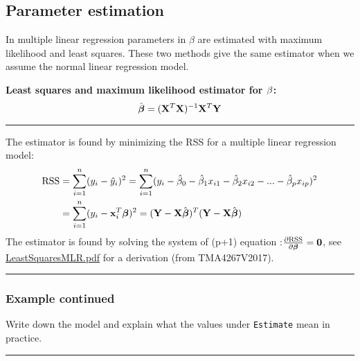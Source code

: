 \documentclass[]{article}
\begin{document}
\hypertarget{parameter-estimation}{%
\subsection{Parameter estimation}\label{parameter-estimation}}

In multiple linear regression parameters in \(\beta\) are estimated with
maximum likelihood and least squares. These two methods give the same
estimator when we assume the normal linear regression model.

\textbf{Least squares and maximum likelihood estimator for
\({\bf \beta}\):}
\[ \hat{\boldsymbol\beta}=({\bf X}^T{\bf X})^{-1} {\bf X}^T {\bf Y}\]

\begin{center}\rule{0.5\linewidth}{\linethickness}\end{center}

The estimator is found by minimizing the RSS for a multiple linear
regression model:
\[\begin{aligned} \text{RSS} &=\sum_{i=1}^n (y_i - \hat y_i)^2 = \sum_{i=1}^n (y_i - \hat \beta_0 - \hat \beta_1 x_{i1} - \hat \beta_2 x_{i2} -...-\hat \beta_p x_{ip} )^2 \\
&= \sum_{i=1}^n (y_i-{\bf x}_i^T \boldsymbol \beta)^2=({\bf Y}-{\bf X}\hat{\boldsymbol{\beta}})^T({\bf Y}-{\bf X}\hat{\boldsymbol{\beta}})\end{aligned}\]
The estimator is found by solving the system of (p+1) equation
:\(\frac{\partial \text{RSS}}{\partial \boldsymbol \beta}={\bf 0}\), see
\href{https://www.math.ntnu.no/emner/TMA4268/2018v/notes/LeastSquaresMLR.pdf}{LeastSquaresMLR.pdf}
for a derivation (from TMA4267V2017).

\begin{center}\rule{0.5\linewidth}{\linethickness}\end{center}

\hypertarget{example-continued-3}{%
\subsubsection{Example continued}\label{example-continued-3}}

Write down the model and explain what the values under \texttt{Estimate}
mean in practice.

\begin{center}\rule{0.5\linewidth}{\linethickness}\end{center}

\footnotesize
\end{document}
